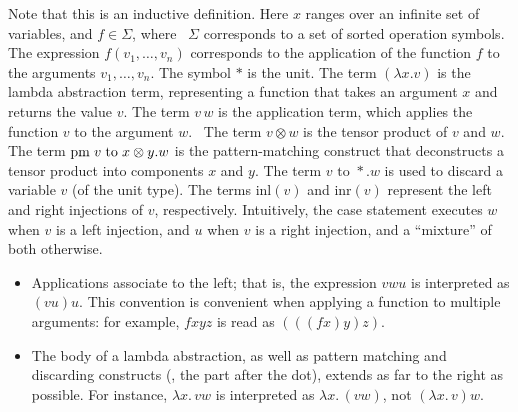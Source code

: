 Note that this is an inductive definition.
Here $x$ ranges over an infinite set of variables, and $f \in \Sigma$, where  $\Sigma$ corresponds to a set of sorted operation symbols. The expression $f(v_1, \ldots, v_n)$ corresponds to the application of the function $f$ to the arguments $v_1, \ldots, v_n$. The symbol $*$ is the unit. The term $(\lambda x. v )$ is the lambda abstraction term, representing a function that takes an argument $x$ and returns the value $v$. The term $v \,w$ is the application term, which applies the function $v$ to the argument $w$.  The term $v \otimes w$ is the tensor product of $v$ and $w$. The term $\text{pm} \hspace{3 pt} v \hspace{3 pt} \text{to} \hspace{3 pt} x \otimes y. w$ is the pattern-matching construct that deconstructs a tensor product into components $x$ and $y$. The term $v \text{ to } *.w$ is used to discard a variable $v$ (of the unit type). The terms $\text{inl}(v)$ and $\text{inr}(v)$ represent the left and right injections of $v$, respectively. Intuitively, the case statement executes $w$ when $v$ is a left injection, and $u$ when $v$ is a right injection, and a ``mixture'' of both otherwise.

\begin{convention}
   \begin{itemize}
    \item Applications associate to the left; that is, the expression $vwu$ is interpreted as $(vu)u$. This convention is convenient when applying a function to multiple arguments: for example, $fxyz$ is read as $(((f x) y) z)$.
    \item The body of a lambda abstraction, as well as pattern matching and discarding constructs (\ie, the part after the dot), extends as far to the right as possible. For instance, $\lambda x.\,vw$ is interpreted as $\lambda x.\,(vw)$, not $(\lambda x.\,v)w$.
   \end{itemize}
\end{convention}






